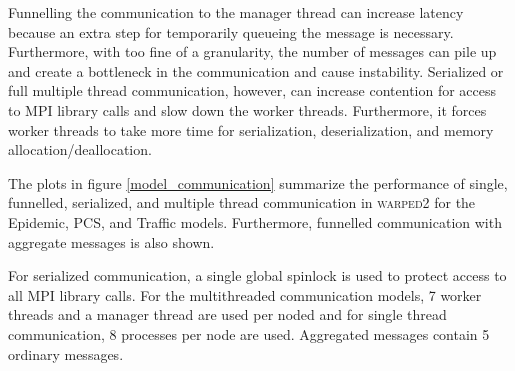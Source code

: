 \documentclass[11pt]{book}
\begin{document}
Funnelling the communication to the manager thread can increase latency because an extra step
for temporarily queueing the message is necessary. Furthermore, with too fine of a granularity,
the number of messages can pile up and create a bottleneck in the communication and cause
instability. Serialized or full multiple thread communication, however, can increase contention
for access to MPI library calls and slow down the worker threads. Furthermore, it forces worker
threads to take more time for serialization, deserialization, and memory allocation/deallocation.

The plots in figure \ref{model_communication} summarize the performance of single, funnelled,
serialized, and multiple thread communication in \textsc{warped2} for the Epidemic, PCS, and
Traffic models. Furthermore, funnelled communication with aggregate messages is also shown.

For serialized communication, a single global spinlock is used to protect access to all MPI library
calls. For the multithreaded communication models, 7 worker threads and a manager thread are used
per noded and for single thread communication, 8 processes per node are used. Aggregated messages
contain 5 ordinary messages.
\end{document}
